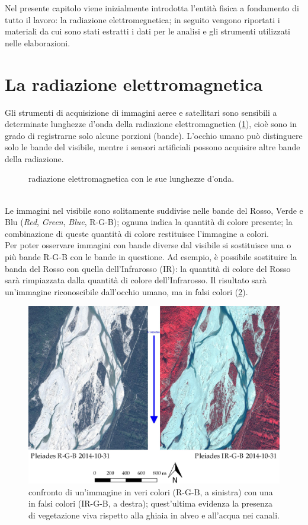 Nel presente capitolo viene inizialmente introdotta l'entità fisica a fondamento di tutto il lavoro: la radiazione elettromegnetica;
in seguito vengono riportati i materiali da cui sono stati estratti i dati per le analisi e gli strumenti utilizzati nelle elaborazioni.


\section{La radiazione elettromagnetica}
Gli strumenti di acquisizione di immagini aeree e satellitari sono sensibili a determinate lunghezze d'onda della radiazione elettromagnetica (\cref{graph:el-mag-radiation}), cioè sono in grado di registrarne solo alcune porzioni (bande).
L'occhio umano può distinguere solo le bande del visibile, mentre i sensori artificiali possono acquisire altre bande della radiazione.
%
\begin{figure}
	\centering
	
	\caption{radiazione elettromagnetica con le sue lunghezze d'onda.}
	\label{graph:el-mag-radiation}
\end{figure}
%
\\
Le immagini nel visibile sono solitamente suddivise nelle bande del Rosso, Verde e Blu (\emph{Red}, \emph{Green}, \emph{Blue}, R-G-B); ognuna indica la quantità di colore presente; la combinazione di queste quantità di colore restituisce l'immagine a colori.
\\
Per poter osservare immagini con bande diverse dal visibile si sostituisce una o più bande R-G-B con le bande in questione.
Ad esempio, è possibile sostituire la banda del Rosso con quella dell'Infrarosso (IR): la quantità di colore del Rosso sarà rimpiazzata dalla quantità di colore dell'Infrarosso.
Il risultato sarà un'immagine riconoscibile dall'occhio umano, ma in falsi colori (\cref{fig:confronto-bande-intro}).
%
\begin{figure}
	\centering
	\includegraphics[width=\textwidth]{files/confronto_bande_intro.jpeg}
	\caption[confronto immagini R-G-B e IR-R-G]{confronto di un'immagine in veri colori (R-G-B, a sinistra) con una in falsi colori (IR-G-B, a destra); quest'ultima evidenza la presenza di vegetazione viva rispetto alla ghiaia in alveo e all'acqua nei canali.}
	\label{fig:confronto-bande-intro}
\end{figure}
